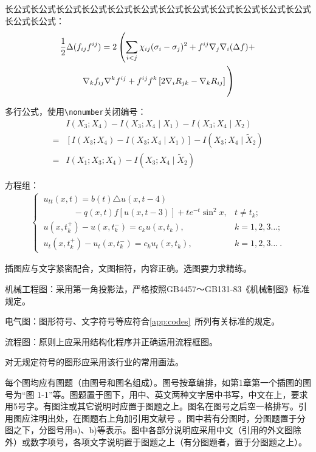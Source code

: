 长公式长公式长公式长公式长公式长公式长公式长公式长公式长公式长公式长公式长公式长公式：
\begin{multline}\label{eq:long}
\frac{1}{2}\Delta(f_{ij}f^{ij})=
2\left(\sum_{i<j}\chi_{ij}(\sigma_i-\sigma_j)^2+f^{ij}\nabla_j\nabla_i(\Delta f)+\right .\\
\left .\nabla_kf_{ij}\nabla^kf^{ij}+f^{ij}f^k\left[2\nabla_iR_{jk}-\nabla_kR_{ij}\right]\vphantom{\sum_{i<j}}\right)
\end{multline}

多行公式，使用\verb|\nonumber|关闭编号：
\begin{align}
&I(X_3;X_4)-I(X_3;X_4\mid{}X_1)-I(X_3;X_4\mid{}X_2)\nonumber\\
=&[I(X_3;X_4)-I(X_3;X_4\mid{}X_1)]-I(X_3;X_4\mid{}\tilde{X}_2)\\
=&I(X_1;X_3;X_4)-I(X_3;X_4\mid{}\tilde{X}_2)
\end{align}

方程组：
\begin{align}
\begin{cases}
\ u_{tt}(x,t)= b(t)\triangle u(x,t-4)&\\
\ \hspace{42pt}- q(x,t)f[u(x,t-3)]+te^{-t}\sin^2 x,  &  t \neq t_k; \\
\ u(x,t_k^+) - u(x,t_k^-) = c_k u(x,t_k), & k=1,2,3\ldots ;\\
\ u_{t}(x,t_k^+) - u_{t}(x,t_k^-) =c_k u_{t}(x,t_k), &
k=1,2,3\ldots\ .
\end{cases}
\end{align}

插图应与文字紧密配合，文图相符，内容正确。选图要力求精练。

机械工程图：采用第一角投影法，严格按照GB4457～GB131-83《机械制图》标准规定。

电气图：图形符号、文字符号等应符合\cref{app:codes}~所列有关标准的规定。

流程图：原则上应采用结构化程序并正确运用流程框图。

对无规定符号的图形应采用该行业的常用画法。

每个图均应有图题（由图号和图名组成）。图号按章编排，如第1章第一个插图的图号为“图 1-1”等。图题置于图下，用中、英文两种文字居中书写，中文在上，要求用5号字。有图注或其它说明时应置于图题之上。图名在图号之后空一格排写。引用图应注明出处，在图题右上角加引用文献号 。图中若有分图时，分图题置于分图之下，分图号用a)、b)等表示。图中各部分说明应采用中文（引用的外文图除外）或数字项号，各项文字说明置于图题之上（有分图题者，置于分图题之上）。


